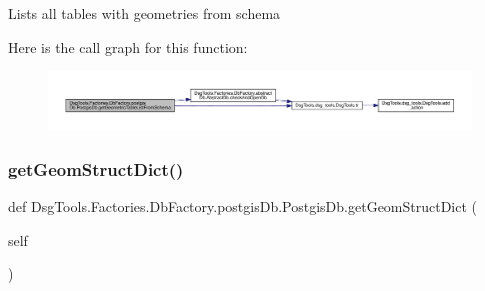 \begin{DoxyVerb}Lists all tables with geometries from schema
\end{DoxyVerb}
 Here is the call graph for this function\+:
\nopagebreak
\begin{figure}[H]
\begin{center}
\leavevmode
\includegraphics[width=350pt]{class_dsg_tools_1_1_factories_1_1_db_factory_1_1postgis_db_1_1_postgis_db_a9fbbc8c65725c8ea6cd7cf2783ba20a4_cgraph}
\end{center}
\end{figure}
\mbox{\label{class_dsg_tools_1_1_factories_1_1_db_factory_1_1postgis_db_1_1_postgis_db_ab6ab584551ee1175f693e3c1dddf4039}} 
\subsubsection{\texorpdfstring{get\+Geom\+Struct\+Dict()}{getGeomStructDict()}}
{\footnotesize\ttfamily def Dsg\+Tools.\+Factories.\+Db\+Factory.\+postgis\+Db.\+Postgis\+Db.\+get\+Geom\+Struct\+Dict (\begin{DoxyParamCaption}\item[{}]{self }\end{DoxyParamCaption})}

